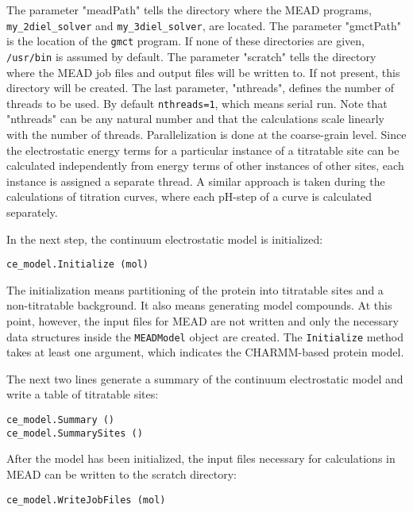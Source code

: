 \documentclass[a4paper,11pt]{article}
\begin{document}
\bigskip
The parameter "meadPath" tells the directory where the MEAD programs,
\texttt{my\_2diel\_solver} and \texttt{my\_3diel\_solver}, are located.
%
The parameter "gmctPath" is the location of the \texttt{gmct} program.
%
If none of these directories are given, \texttt{/usr/bin} is assumed
by default.
%
The parameter "scratch" tells the directory where the MEAD job files
and output files will be written to.
%
If not present, this directory will be created.
%
The last parameter, "nthreads", defines the number of threads to be used.
%
By default \texttt{nthreads=1}, which means serial run.
%
Note that "nthreads" can be any natural number and that the calculations
scale linearly with the number of threads.
%
Parallelization is done at the coarse-grain level.
%
Since the electrostatic energy terms for a particular instance of a titratable
site can be calculated independently from energy terms of other instances of other
sites, each instance is assigned a separate thread.
%
A similar approach is taken during the calculations of titration curves,
where each pH-step of a curve is calculated separately.


\bigskip
In the next step, the continuum electrostatic model is initialized:

{\footnotesize \begin{lstlisting}
ce_model.Initialize (mol)
\end{lstlisting} }

\bigskip
The initialization means partitioning of the protein into titratable sites and
a non-titratable background.
%
It also means generating model compounds.
%
At this point, however, the input files for MEAD are not written and only
the necessary data structures inside the \texttt{MEADModel} object are created.
%
The \texttt{Initialize} method takes at least one argument,
which indicates the CHARMM-based protein model.

\bigskip
The next two lines generate a summary of the continuum electrostatic model and
write a table of titratable sites:

{\footnotesize \begin{lstlisting}
ce_model.Summary ()
ce_model.SummarySites ()
\end{lstlisting} }

\bigskip
After the model has been initialized, the input files necessary for calculations in MEAD
can be written to the scratch directory:

{\footnotesize \begin{lstlisting}
ce_model.WriteJobFiles (mol)
\end{lstlisting} }
\end{document}

